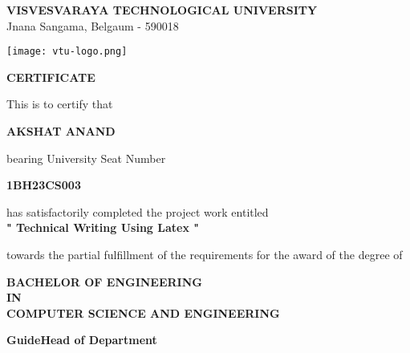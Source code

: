 \documentclass[12pt,a4paper]{report}
\begin{document}
\begin{titlepage}
\begin{center}

\textbf{{\large VISVESVARAYA TECHNOLOGICAL UNIVERSITY}}\\
{\normalsize Jnana Sangama, Belgaum - 590018}\\
\vspace{0.5in}

\texttt{[image: vtu-logo.png]}\\
\vspace{0.5in}

\textbf{CERTIFICATE}\\
\vspace{0.3in}

This is to certify that\\
\vspace{0.2in}

\textbf{AKSHAT ANAND}\\
\vspace{0.2in}

bearing University Seat Number\\
\vspace{0.2in}

\textbf{1BH23CS003}\\
\vspace{0.2in}

has satisfactorily completed the project work entitled\\
\vspace{0.2in}
\textbf{" Technical Writing Using Latex "}\\
\vspace{0.2in}
\vspace{0.2in}

towards the partial fulfillment of the requirements for the award of the degree of\\
\vspace{0.2in}

\textbf{BACHELOR OF ENGINEERING\\IN\\COMPUTER SCIENCE AND ENGINEERING}\\
\vspace{0.5in}

\hspace{0.5in}\textbf{Guide}\hspace{2.8in}\textbf{Head of Department}\\
\vspace{0.3in}


\end{center}
\end{titlepage}
\end{document}
